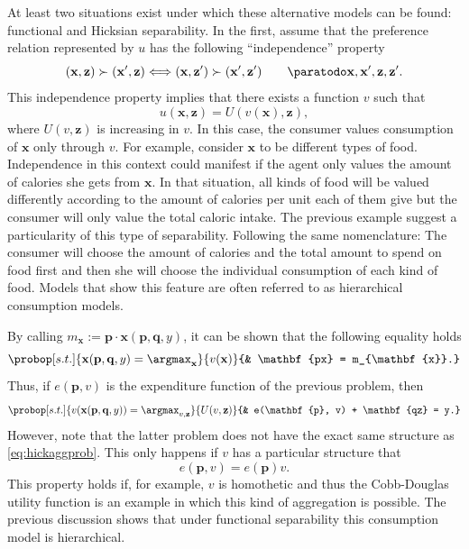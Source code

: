 \documentclass[english, a4paper, 12pt]{article}
\begin{document}
At least two situations exist under which these alternative models can be found: functional and Hicksian separability. In the first, assume that the preference relation represented by $u$ has the following ``independence'' property
	\begin{equation} \label{eq:indepPref}
		(\mathbf{x}, \mathbf{z}) \succ (\mathbf{x}', \mathbf{z}) 
			\Longleftrightarrow
		(\mathbf{x}, \mathbf{z}') \succ (\mathbf{x}', \mathbf{z}') \qquad \paratodo \mathbf{x}, \mathbf{x}', \mathbf{z}, \mathbf{z}'.
	\end{equation}
This independence property implies that there exists a function $v$ such that
	$$u(\mathbf{x}, \mathbf{z}) = U(v(\mathbf{x}), \mathbf{z}),$$
where $U(v,\mathbf{z})$ is increasing in $v$. In this case, the consumer values consumption of $\mathbf{x}$ only through $v$. For example, consider $\mathbf{x}$ to be different types of food. Independence in this context could manifest if the agent only values the amount of calories she gets from $\mathbf{x}$. In that situation, all kinds of food will be valued differently according to the amount of calories per unit each of them give but the consumer will only value the total caloric intake. The previous example suggest a particularity of this type of separability. Following the same nomenclature: The consumer will choose the amount of calories and the total amount to spend on food first and then she will choose the individual consumption of each kind of food. Models that show this feature are often referred to as hierarchical consumption models.

By calling $m_{\mathbf{x}} := \mathbf{p}\cdot \mathbf{x}(\mathbf{p}, \mathbf{q}, y)$, it can be shown that the following equality holds
	$$\probop[s.t.]{\mathbf{x}(\mathbf{p}, \mathbf{q}, y) = \argmax_{\mathbf{x}}}{v(\mathbf{x})}
					{&	\mathbf{px} = m_{\mathbf{x}}.}$$
Thus, if $e(\mathbf{p}, v)$ is the expenditure function of the previous problem, then
	$$	\probop[s.t.]{v(\mathbf{x}(\mathbf{p}, \mathbf{q}, y)) = \argmax_{v, \mathbf{z}}}{U(v, \mathbf{z})}
				{&	e(\mathbf{p}, v) + \mathbf{qz} = y.}
	$$
However, note that the latter problem does not have the exact same structure as \eqref{eq:hickaggprob}. This only happens if $v$ has a particular structure that 
	$$e(\mathbf{p}, v) = e(\mathbf{p})v.$$
This property holds if, for example, $v$ is homothetic and thus the Cobb-Douglas utility function is an example in which this kind of aggregation is possible. The previous discussion shows that under functional separability this consumption model is hierarchical.
\end{document}
